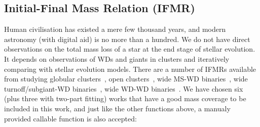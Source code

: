 \documentclass[fleqn,usenatbib]{rasti}
\begin{document}
\subsection{Initial-Final Mass Relation (IFMR)}
Human civilisation has existed a mere few thousand years, and modern astronomy
(with digital aid) is no more than a hundred. We do not have direct
observations on the total mass loss of a star at the end stage of stellar
evolution. It depends on observations of WDs and giants in clusters and
iteratively comparing with stellar evolution models. There are a number of
IFMRs available from studying globular clusters~\citep{2004A&A...420..515M,
2009ApJ...705..408K}, open clusters~\citep{2009ApJ...693..355W,
2016ApJ...818...84C}, wide MS-WD binaries~\citep{2008A&A...477..213C,
2012ApJ...746..144Z, 2018ApJ...860L..17E}, wide turnoff/subgiant-WD
binaries~\citep{2021ApJ...923..181B}, wide WD-WD
binaries~\citep{2015ASPC..493..325C, 2015ApJ...815...63A, 2018ApJ...866...21C}.
We have chosen six (plus three with two-part fitting) works that have a
good mass coverage to be included in this work, and just like the other
functions above, a manualy provided callable function is also accepted:
\end{document}
